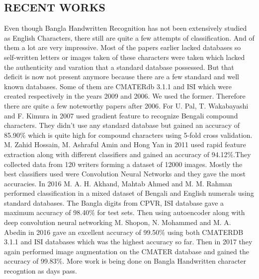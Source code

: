 \documentclass[conference]{IEEEtran}
\begin{document}
\subsection{RECENT WORKS}
Even though Bangla Handwritten Recognition has not been extensively studied as English Characters, there still are quite a few attempts of classification. And of them a lot are very impressive. Most of the papers earlier lacked databases so self-written letters or images taken of these characters were taken which lacked the authenticity and varation that a standard database possessed. But that deficit is now not present anymore because there are a few standard and well known databases. Some of them are CMATERdb 3.1.1\cite{cmater} and ISI\cite{isi} which were created respectively in the years 2009 and 2006. We used the former. Therefore there are quite a few noteworthy papers after 2006. For U. Pal, T. Wakabayashi and F. Kimura in 2007\cite{gradientfeature} used gradient feature to recognize Bengali compound characters. They didn't use any standard database but gained an accuracy of 85.90\% which is quite high for compound characters using 5-fold cross validation. M. Zahid Hossain, M. Ashraful Amin and Hong Yan in 2011\cite{rapidfeature} used rapid feature extraction along with different classifiers and gained an accuracy of 94.12\%.They collected data from 120 writers forming a dataset of 12000 images. Mostly the best classifiers used were Convolution Neural Networks and they gave the most accuracies. In 2016\cite{convolution} M. A. H. Akhand, Mahtab Ahmed and M. M. Rahman performed classification in a mixed dataset of Bengali and English numerals using standard databases. The Bangla digits from CPVR, ISI\cite{isi} database gave a maximum accuracy of 98.40\% for test sets. Then using autoencoder along with deep convolution neural networking M. Shopon, N. Mohammed and M. A. Abedin in 2016\cite{autoencoder} gave an excellent accuracy of 99.50\% using both CMATERDB 3.1.1\cite{cmater} and ISI\cite{isi} databases which was the highest accuracy so far. Then in 2017\cite{blocky} they again performed image augmentation on the CMATER database and gained the accuracy of 99.83\%. More work is being done on Bangla Handwritten character recogntion as days pass.

\end{document}
